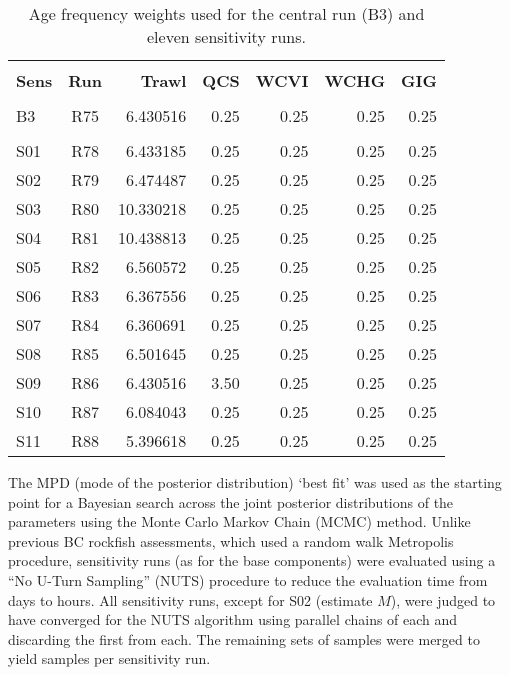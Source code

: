 \documentclass[11pt]{book}
\begin{document}
\setlength{\tabcolsep}{4pt}
\begin{table}[!h]
\centering
\caption{Age frequency weights used for the central run (B3) and eleven sensitivity runs.}
\label{tab:sensAFwts}
\usefont{\encodingdefault}{\familydefault}{\seriesdefault}{\shapedefault}\small
\begin{tabular}{lcrrrrr}
\hline \\ [-1.5ex]
{\bf Sens} & {\bf Run} & {\bf Trawl} & {\bf QCS} & {\bf WCVI} & {\bf WCHG} & {\bf GIG} \\ [0.2ex]
\hline \\ [-1.5ex]
B3 & R75 & 6.430516 & 0.25 & 0.25 & 0.25 & 0.25 \\
\hdashline \\ [-1.75ex]
S01 & R78 &  6.433185 & 0.25 & 0.25 & 0.25 & 0.25 \\
S02 & R79 &  6.474487 & 0.25 & 0.25 & 0.25 & 0.25 \\
S03 & R80 & 10.330218 & 0.25 & 0.25 & 0.25 & 0.25 \\
S04 & R81 & 10.438813 & 0.25 & 0.25 & 0.25 & 0.25 \\
S05 & R82 &  6.560572 & 0.25 & 0.25 & 0.25 & 0.25 \\
S06 & R83 &  6.367556 & 0.25 & 0.25 & 0.25 & 0.25 \\
S07 & R84 &  6.360691 & 0.25 & 0.25 & 0.25 & 0.25 \\
S08 & R85 &  6.501645 & 0.25 & 0.25 & 0.25 & 0.25 \\
S09 & R86 &  6.430516 & 3.50 & 0.25 & 0.25 & 0.25 \\
S10 & R87 &  6.084043 & 0.25 & 0.25 & 0.25 & 0.25 \\
S11 & R88 &  5.396618 & 0.25 & 0.25 & 0.25 & 0.25 \\
\hline
\end{tabular}
\usefont{\encodingdefault}{\familydefault}{\seriesdefault}{\shapedefault}\normalsize
\end{table}

The MPD (mode of the posterior distribution) `best fit' was used as the starting point for a Bayesian search across the joint posterior distributions of the parameters using the Monte Carlo Markov Chain (MCMC) method.
Unlike previous BC rockfish assessments, which used a random walk Metropolis procedure, sensitivity runs (as for the base components) were evaluated using a ``No U-Turn Sampling'' (NUTS) procedure to reduce the evaluation time from days to hours.
All sensitivity runs, except for S02 (estimate $M$), were judged to have converged for the NUTS algorithm using \nChains{} parallel chains of \cSims{} each and discarding the first \cBurn{} from each. 
The remaining \nChains{} sets of \cSamps{} samples were merged to yield \Nmcmc{} samples per sensitivity run.
\end{document}
